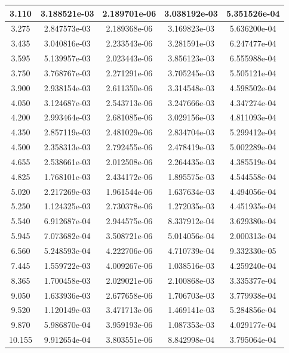 \documentclass[fleqn,usenatbib]{mnras}
\begin{document}
\begin{table}
\begin{tabular}{c|cc|cc}
    3.110  & 3.188521e-03 & 2.189701e-06 & 3.038192e-03 & 5.351526e-04 \\ \hline
    3.275  & 2.847573e-03 & 2.189368e-06 & 3.169823e-03 & 5.636200e-04 \\
    3.435  & 3.040816e-03 & 2.233543e-06 & 3.281591e-03 & 6.247477e-04 \\
    3.595  & 5.139957e-03 & 2.023443e-06 & 3.856123e-03 & 6.555988e-04 \\
    3.750  & 3.768767e-03 & 2.271291e-06 & 3.705245e-03 & 5.505121e-04 \\
    3.900  & 2.938154e-03 & 2.611350e-06 & 3.314548e-03 & 4.598502e-04 \\ \hline
    4.050  & 3.124687e-03 & 2.543713e-06 & 3.247666e-03 & 4.347274e-04 \\
    4.200  & 2.993464e-03 & 2.681085e-06 & 3.029156e-03 & 4.811093e-04 \\
    4.350  & 2.857119e-03 & 2.481029e-06 & 2.834704e-03 & 5.299412e-04 \\
    4.500  & 2.358313e-03 & 2.792455e-06 & 2.478419e-03 & 5.002289e-04 \\
    4.655  & 2.538661e-03 & 2.012508e-06 & 2.264435e-03 & 4.385519e-04 \\ \hline
    4.825  & 1.768101e-03 & 2.434172e-06 & 1.895575e-03 & 4.544558e-04 \\
    5.020  & 2.217269e-03 & 1.961544e-06 & 1.637634e-03 & 4.494056e-04 \\
    5.250  & 1.124325e-03 & 2.730378e-06 & 1.272035e-03 & 4.451935e-04 \\
    5.540  & 6.912687e-04 & 2.944575e-06 & 8.337912e-04 & 3.629380e-04 \\
    5.945  & 7.073682e-04 & 3.508721e-06 & 5.014056e-04 & 2.000313e-04 \\ \hline
    6.560  & 5.248593e-04 & 4.222706e-06 & 4.710739e-04 & 9.332330e-05 \\
    7.445  & 1.559722e-03 & 4.009267e-06 & 1.038516e-03 & 4.259240e-04 \\
    8.365  & 1.700458e-03 & 2.029021e-06 & 2.100868e-03 & 3.335377e-04 \\
    9.050  & 1.633936e-03 & 2.677658e-06 & 1.706703e-03 & 3.779938e-04 \\
    9.520  & 1.120149e-03 & 3.471713e-06 & 1.469141e-03 & 5.284856e-04 \\ \hline
    9.870  & 5.986870e-04 & 3.959193e-06 & 1.087353e-03 & 4.029177e-04 \\
    10.155 & 9.912654e-04 & 3.803551e-06 & 8.842998e-04 & 3.795064e-04 \\

\end{tabular}
\end{table}
\end{document}
